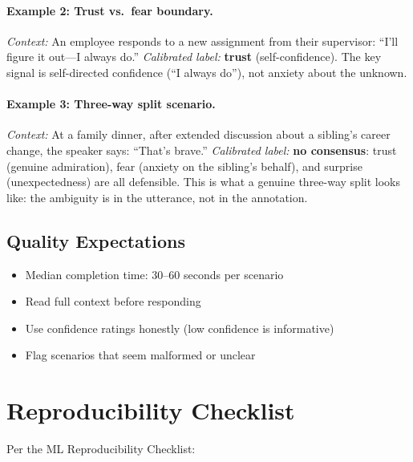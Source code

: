 \documentclass[twoside,11pt]{article}
\begin{document}
\paragraph{Example 2: Trust vs.\ fear boundary.} \textit{Context:} An employee responds to a new assignment from their supervisor: ``I'll figure it out---I always do.'' \textit{Calibrated label:} \textbf{trust} (self-confidence). The key signal is self-directed confidence (``I always do''), not anxiety about the unknown.

\paragraph{Example 3: Three-way split scenario.} \textit{Context:} At a family dinner, after extended discussion about a sibling's career change, the speaker says: ``That's brave.'' \textit{Calibrated label:} \textbf{no consensus}: trust (genuine admiration), fear (anxiety on the sibling's behalf), and surprise (unexpectedness) are all defensible. This is what a genuine three-way split looks like: the ambiguity is in the utterance, not in the annotation.

\subsection{Quality Expectations}

\begin{itemize}[leftmargin=*,noitemsep]
    \item Median completion time: 30--60 seconds per scenario
    \item Read full context before responding
    \item Use confidence ratings honestly (low confidence is informative)
    \item Flag scenarios that seem malformed or unclear
\end{itemize}

\section{Reproducibility Checklist}
\label{app:reproducibility}

Per the \citet{pineau2021improving} ML Reproducibility Checklist:
\end{document}
